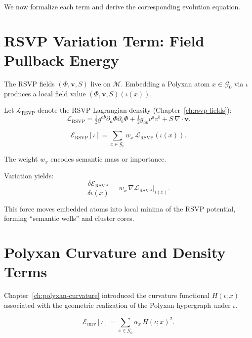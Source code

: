 We now formalize each term and derive the corresponding evolution equation.

\section{RSVP Variation Term: Field Pullback Energy}

The RSVP fields $(\Phi,\mathbf{v},S)$ live on $\mathcal{M}$.
Embedding a Polyxan atom $x \in \mathcal{G}_0$ via $\iota$ produces a local field
value
\(
  (\Phi,\mathbf{v},S)(\iota(x)).
\)

Let $\mathcal{L}_{\mathrm{RSVP}}$ denote the RSVP Lagrangian density
(Chapter~\ref{ch:rsvp-fields}):
\[
  \mathcal{L}_{\mathrm{RSVP}}
  =
    \tfrac{1}{2} g^{ab}\partial_a\Phi\partial_b\Phi
    + \tfrac{1}{2} g_{ab} v^a v^b
    + S\,\nabla\!\cdot\!\mathbf{v}.
\]

\begin{definition}
\[
  \mathcal{E}_{\mathrm{RSVP}}[\iota]
  =
  \sum_{x\in\mathcal{G}_0}
    w_x \,
    \mathcal{L}_{\mathrm{RSVP}}(\iota(x)).
\]
\end{definition}

The weight $w_x$ encodes semantic mass or importance.

Variation yields:
\[
  \frac{\delta \mathcal{E}_{\mathrm{RSVP}}}{\delta \iota(x)}
  = 
  w_x \, \nabla\mathcal{L}_{\mathrm{RSVP}}|_{\iota(x)}.
\]

This force moves embedded atoms into local minima of the RSVP potential,
forming “semantic wells” and cluster cores.

\section{Polyxan Curvature and Density Terms}

Chapter~\ref{ch:polyxan-curvature} introduced the curvature functional
$H(\iota;x)$ associated with the geometric realization of the Polyxan
hypergraph under $\iota$.

\begin{definition}
\[
  \mathcal{E}_{\mathrm{curv}}[\iota]
  =
  \sum_{x\in\mathcal{G}_0}
  \alpha_x \, H(\iota;x)^2.
\]
\end{definition}


